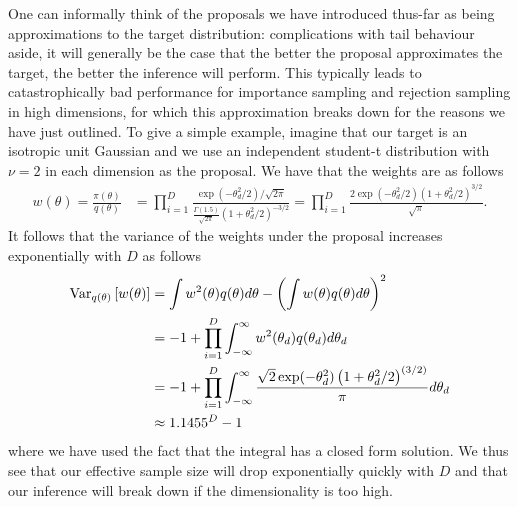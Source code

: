 One can informally think of the proposals we have introduced thus-far as being
approximations to the target distribution: complications with tail behaviour aside, it will
generally be the case that the better the proposal approximates the target, the better the
inference will perform.  This typically leads to catastrophically bad performance for
importance sampling and rejection sampling in high dimensions, for which this approximation
breaks down for the reasons we have just outlined.  To give a simple example, imagine that
our target is an isotropic unit Gaussian and we use an independent student-t distribution
with $\nu=2$ in each dimension as the proposal.  We have that the weights are as follows
\begin{align}
w(\theta) = \frac{\pi(\theta)}{q(\theta)} &= \prod_{i=1}^{D} \frac{\exp(-\theta_d^2/2)/\sqrt{2\pi}}
{\frac{\Gamma(1.5)}{\sqrt{2\pi}}\left(1+\theta_d^2/2\right)^{-3/2} } =\prod_{i=1}^{D} \frac{2 \exp(-\theta_d^2/2) \left(1+\theta_d^2/2\right)^{3/2}}{\sqrt{\pi}}.
\end{align}
It follows that the variance of the weights under the proposal increases exponentially
with $D$ as follows
\begin{align}
\mathrm{Var}_{q(\theta)} \left[w(\theta)\right] &= \int w^2(\theta)q(\theta)d\theta -
\left(\int w(\theta)q(\theta)d\theta\right)^2 \nonumber\\
&=-1+ \prod_{i=1}^{D} \int_{-\infty}^{\infty} w^2(\theta_d)q(\theta_d)d\theta_d \nonumber\\
&=-1+\prod_{i=1}^{D} \int_{-\infty}^{\infty} \frac{\sqrt{2}\exp(-\theta_d^2)\left(1+\theta^2_d/2\right)^{(3/2)}}
{\pi}d\theta_d \nonumber \\
&\approx 1.1455^D-1
\end{align}
where we have used the fact that the integral has a closed form solution.
We thus see that our effective sample size
will drop exponentially quickly with $D$ and that our inference will break down if
the dimensionality is too high.

